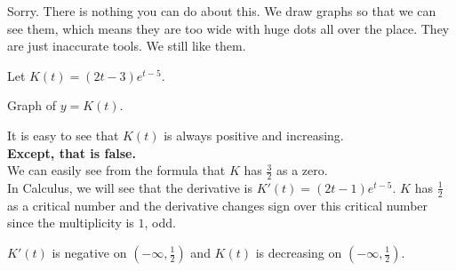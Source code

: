 \documentclass{ximera}
\begin{document}
Sorry.  There is nothing you can do about this. We draw graphs so that we can see them, which means they are too wide with huge dots all over the place. They are just inaccurate tools.  We still like them.





\begin{example}


Let $K(t) = (2t-3)e^{t-5}$.


Graph of $y = K(t)$.



\begin{image}
\end{image}



It is easy to see that $K(t)$ is always positive and increasing. \\

\textbf{\textcolor{red!70!black}{Except, that is false.}} \\

We can easily see from the formula that $K$ has $\frac{3}{2}$ as a zero.\\


In Calculus, we will see that the derivative is $K'(t) = (2t-1)e^{t-5}$.   $K$ has $\frac{1}{2}$ as a critical number and the derivative changes sign over this critical number since the multiplicity is $1$, odd.

$K'(t)$ is negative on $\left( -\infty, \frac{1}{2} \right)$ and $K(t)$ is decreasing on $\left( -\infty, \frac{1}{2} \right)$.


\end{example}
\end{document}
